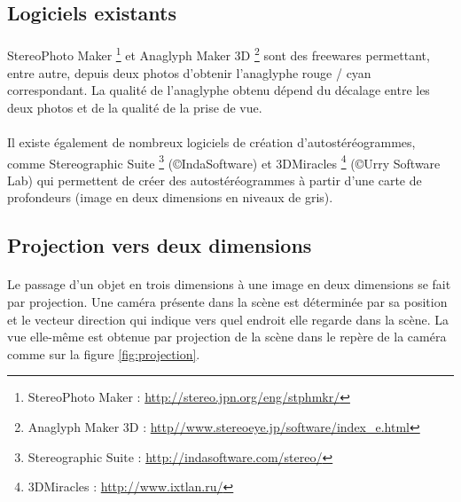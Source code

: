 \subsection{Logiciels existants}

\paragraph{}
	StereoPhoto Maker \footnote{StereoPhoto Maker : \url{http://stereo.jpn.org/eng/stphmkr/}} et Anaglyph Maker 3D \footnote{Anaglyph Maker 3D : \url{http//www.stereoeye.jp/software/index\_e.html}} sont des freewares permettant, entre autre, depuis deux photos d'obtenir l’anaglyphe rouge / cyan correspondant. La qualité de l'anaglyphe obtenu dépend du décalage entre les deux photos et de la qualité de la prise de vue. 
	
\paragraph{}
	Il existe également de nombreux logiciels de création d'autostéréogrammes, comme Stereographic Suite \footnote{Stereographic Suite : \url{http://indasoftware.com/stereo/}} (\copyright IndaSoftware) et 3DMiracles \footnote{3DMiracles : \url{http://www.ixtlan.ru/}} (\copyright Urry Software Lab) qui permettent de créer des autostéréogrammes à partir d'une carte de profondeurs (image en deux dimensions en niveaux de gris).
	
\subsection{Projection vers deux dimensions}

\paragraph{}
	Le passage d’un objet en trois dimensions à une image en deux dimensions se fait par projection. Une caméra présente dans la scène est déterminée par sa position et le vecteur direction qui indique vers quel endroit elle regarde dans la scène. La vue elle-même est obtenue par projection de la scène dans le repère de la caméra comme sur la figure  \ref{fig:projection}.
	
